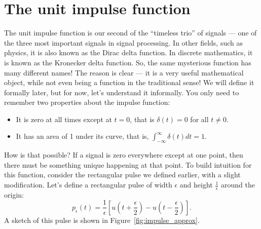 \documentclass{ee102_notes}
\begin{document}
\section{The unit impulse function}
The unit impulse function is our second of the ``timeless trio'' of signals --- one of the three most important signals in signal processing. In other fields, such as physics, it is also known as the Dirac delta function. In discrete mathematics, it is known as the Kronecker delta function. So, the same mysterious function has many different names! The reason is clear --- it is a very useful mathematical object, while not even being a function in the traditional sense! We will define it formally later, but for now, let's understand it informally. You only need to remember two properties about the impulse function:
\begin{itemize}
    \item It is zero at all times except at $t = 0$, that is $\delta(t) = 0$ for all $t \neq 0$.
    \item It has an area of 1 under its curve, that is, $\int_{-\infty}^{\infty} \delta(t) dt = 1$.
\end{itemize}
How is that possible? If a signal is zero everywhere except at one point, then there must be something unique happening at that point. To build intuition for this function, consider the rectangular pulse we defined earlier, with a slight modification. Let's define a rectangular pulse of width $\epsilon$ and height $\frac{1}{\epsilon}$ around the origin:
\[
p_\epsilon(t) = \frac{1}{\epsilon} \left[u\left(t + \frac{\epsilon}{2}\right) - u\left(t - \frac{\epsilon}{2}\right)\right].
\]
A sketch of this pulse is shown in Figure~\ref{fig:impulse_approx}. 
\end{document}
